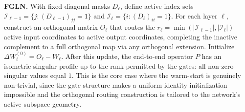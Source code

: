 \documentclass{article}
\newcommand{\note}{\textcolor{blue}}
\begin{document}
\textbf{FGLN.}
With fixed diagonal masks $D_\ell$, define active index sets
$\mathcal{I}_{\ell-1} = \{j : (D_{\ell-1})_{jj} = 1\}$ and
$\mathcal{I}_\ell = \{i : (D_\ell)_{ii} = 1\}$.
For each layer $\ell$, construct an orthogonal matrix $O_\ell$ that routes
the $r_\ell = \min(|\mathcal{I}_{\ell-1}|, |\mathcal{I}_\ell|)$ active
input coordinates to active output coordinates, completing the inactive
complement to a full orthogonal map via any orthogonal extension.
Initialize $\Delta W_\ell^{(0)} = O_\ell - W_\ell$.
After this update, the end-to-end operator $P$ has an isometric singular
profile up to the rank permitted by the gates: all non-zero singular values
equal $1$.
This is the core case where the warm-start is genuinely non-trivial, since
the gate structure makes a uniform identity initialization impossible and the
orthogonal routing construction is tailored to the network's active subspace
geometry.




\end{document}

